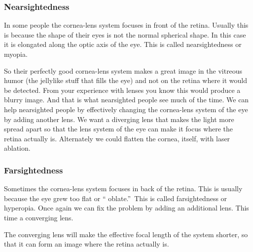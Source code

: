 \documentclass{article}
\begin{document}
\subsubsection{Nearsightedness}

In some people the cornea-lens system focuses in front of the retina.
Usually this is because the shape of their eyes is not the normal spherical
shape. In this case it is elongated along the optic axis of the eye. This is
called nearsightedness or myopia.

So their perfectly good
cornea-lens system makes a great image in the vitreous humor (the jellylike
stuff that fills the eye) and not on the retina where it would be detected.
From your experience with lenses you know this would produce a blurry image.
And that is what nearsighted people see much of the time. We can help
nearsighted people by effectively changing the cornea-lens system of the eye
by adding another lens. We want a diverging lens that makes the light more
spread apart so that the lens system of the eye can make it focus where the
retina actually is. Alternately we could flatten the cornea, itself, with
laser ablation.

\subsubsection{Farsightedness}

Sometimes the cornea-lens system focuses in back of the retina. This is
usually because the eye grew too flat or \textquotedblleft
oblate.\textquotedblright\ This is called farsightedness or hyperopia. Once
again we can fix the problem by adding an additional lens. This time a
converging lens.

The converging lens will make the
effective focal length of the system shorter, so that it can form an image
where the retina actually is.
\end{document}

